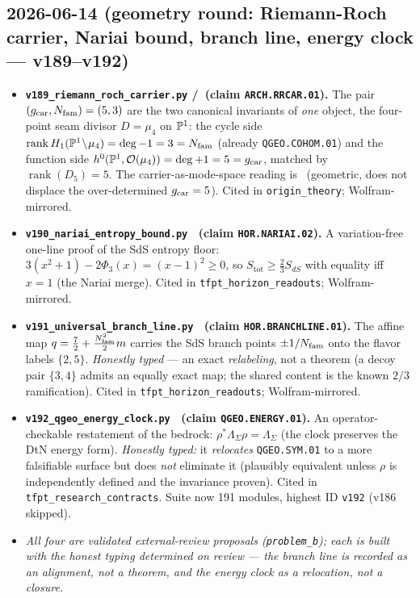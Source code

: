 \subsection*{2026-06-14 (geometry round: Riemann-Roch carrier, Nariai bound, branch line, energy clock --- v189--v192)}
\begin{itemize}
\item \textbf{\texttt{v189\_riemann\_roch\_carrier.py} \mE/\mC\ (claim \texttt{ARCH.RRCAR.01}).} The pair
  $(g_{\mathrm{car}},N_{\mathrm{fam}})=(5,3)$ are the two canonical invariants of \emph{one} object, the four-point seam divisor
  $D=\mu_4$ on $\mathbb{P}^1$: the cycle side $\operatorname{rank}H_1(\mathbb{P}^1\!\setminus\!\mu_4)=\deg{-}1=3=N_{\mathrm{fam}}$
  (already \texttt{QGEO.COHOM.01}) and the function side $h^0(\mathbb{P}^1,\mathcal O(\mu_4))=\deg{+}1=5=g_{\mathrm{car}}$,
  matched by $\operatorname{rank}(D_5)=5$. The carrier-as-mode-space reading is \mC\ (geometric, does not
  displace the over-determined $g_{\mathrm{car}}=5$). Cited in \texttt{origin\_theory}; Wolfram-mirrored.
\item \textbf{\texttt{v190\_nariai\_entropy\_bound.py} \mE\ (claim \texttt{HOR.NARIAI.02}).} A
  variation-free one-line proof of the SdS entropy floor: $3(x^2{+}1)-2\Phi_3(x)=(x{-}1)^2\ge0$, so
  $S_{\mathrm{tot}}\ge\tfrac23 S_{dS}$ with equality iff $x=1$ (the Nariai merge). Cited in
  \texttt{tfpt\_horizon\_readouts}; Wolfram-mirrored.
\item \textbf{\texttt{v191\_universal\_branch\_line.py} \mC\ (claim \texttt{HOR.BRANCHLINE.01}).} The affine
  map $q=\tfrac72+\tfrac{N_{\mathrm{fam}}^2}{2}m$ carries the SdS branch points ${\pm}1/N_{\mathrm{fam}}$ onto the flavor labels
  $\{2,5\}$. \emph{Honestly typed \mC} --- an exact \emph{relabeling}, not a theorem (a decoy pair $\{3,4\}$
  admits an equally exact map; the shared content is the known $2/3$ ramification). Cited in
  \texttt{tfpt\_horizon\_readouts}; Wolfram-mirrored.
\item \textbf{\texttt{v192\_qgeo\_energy\_clock.py} \mO\ (claim \texttt{QGEO.ENERGY.01}).} An
  operator-checkable restatement of the bedrock: $\rho^*\Lambda_\Sigma\rho=\Lambda_\Sigma$ (the clock
  preserves the DtN energy form). \emph{Honestly typed:} it \emph{relocates} \texttt{QGEO.SYM.01} to a more
  falsifiable surface but does \emph{not} eliminate it (plausibly equivalent unless $\rho$ is independently
  defined and the invariance proven). Cited in \texttt{tfpt\_research\_contracts}. Suite now 191 modules,
  highest ID \texttt{v192} (v186 skipped).
\item \emph{All four are validated external-review proposals (\texttt{problem\_b}); each is built with the
  honest typing determined on review --- the branch line is recorded as an alignment, not a theorem, and
  the energy clock as a relocation, not a closure.}
\end{itemize}

